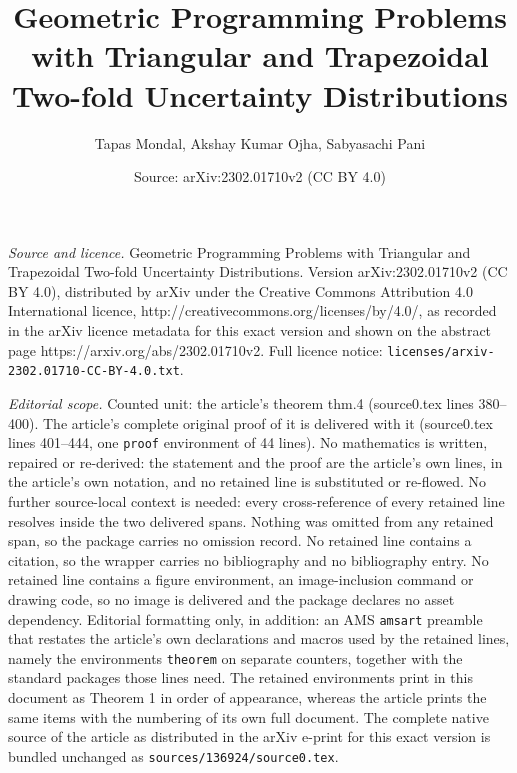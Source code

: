 \documentclass[10pt,a4paper]{amsart}
\title{Geometric Programming Problems with Triangular and Trapezoidal Two-fold Uncertainty Distributions}
\author{Tapas Mondal, Akshay Kumar Ojha, Sabyasachi Pani}
\date{Source: arXiv:2302.01710v2 (CC BY 4.0)}
\begin{document}
\maketitle

\noindent\emph{Source and licence.} Geometric Programming Problems with Triangular and Trapezoidal Two-fold Uncertainty Distributions. Version arXiv:2302.01710v2 (CC BY 4.0), distributed by arXiv under the Creative Commons Attribution 4.0 International licence, http://creativecommons.org/licenses/by/4.0/, as recorded in the arXiv licence metadata for this exact version and shown on the abstract page https://arxiv.org/abs/2302.01710v2. Full licence notice: \texttt{licenses/arxiv-2302.01710-CC-BY-4.0.txt}.\par\smallskip

\noindent\textit{Editorial scope.} Counted unit: the article's theorem thm.4 (source0.tex lines 380--400). The article's complete original proof of it is delivered with it (source0.tex lines 401--444, one \texttt{proof} environment of 44 lines). No mathematics is written, repaired or re-derived: the statement and the proof are the article's own lines, in the article's own notation, and no retained line is substituted or re-flowed.  No further source-local context is needed: every cross-reference of every retained line resolves inside the two delivered spans.  Nothing was omitted from any retained span, so the package carries no omission record.  No retained line contains a citation, so the wrapper carries no bibliography and no bibliography entry.  No retained line contains a figure environment, an image-inclusion command or drawing code, so no image is delivered and the package declares no asset dependency.  Editorial formatting only, in addition: an AMS \texttt{amsart} preamble that restates the article's own declarations and macros used by the retained lines, namely the environments \texttt{theorem} on separate counters, together with the standard packages those lines need.  The retained environments print in this document as Theorem 1 in order of appearance, whereas the article prints the same items with the numbering of its own full document.  The complete native source of the article as distributed in the arXiv e-print for this exact version is bundled unchanged as \texttt{sources/136924/source0.tex}.
\end{document}
